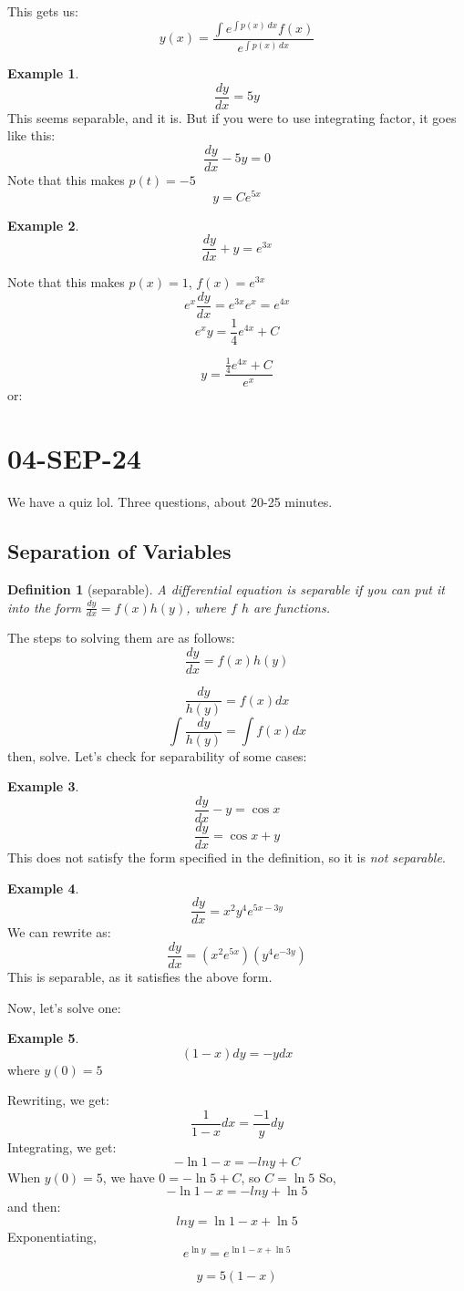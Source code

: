 \documentclass[10pt, oneside]{article}
\newtheorem{defn}{Definition}
\theoremstyle{definition}
\newtheorem{example}{Example}[section]
\begin{document}
This gets us:
\[y(x) = \frac{\int{e^{\int{p(x) \, dx}} f(x)}}{e^{\int{p(x) \, dx}}}\]

\begin{example}
    \[\frac{dy}{dx} = 5y\]
This seems separable, and it is. But if you were to use integrating factor, it goes like this:
\[
    \frac{dy}{dx} - 5y = 0
\]
Note that this makes $p(t) = -5$
\[
y = Ce^{5x}
\]
\end{example}

\begin{example}
    \[\frac{dy}{dx} + y = e^{3x}\]

Note that this makes $p(x) = 1$, $f(x) = e^{3x}$
\[
e^{x}\frac{dy}{dx} = e^{3x}e^x = e^{4x}
\]
\[
e^{x}y = \frac{1}{4}e^{4x} + C
\]

\[
y = \frac{\frac{1}{4}e^{4x} + C}{e^{x}}
\]
or:
\end{example}
\section{04-SEP-24}
We have a quiz lol. Three questions, about 20-25 minutes. 
\subsection{Separation of Variables}
\begin{defn}[separable]
A differential equation is separable if you can put it into the form  $\frac{dy}{dx} = f(x)h(y)$, where $f$ $h$ are functions. 
\end{defn}
The steps to solving them are as follows:
\[ 
    \frac{dy}{dx} = f(x)h(y)
\]

\[ 
    \frac{dy}{h(y)} = f(x)dx
\]
\[ 
    \int{\frac{dy}{h(y)}} = \int{f(x)dx}
\]
then, solve. 
Let's check for separability of some cases:
\begin{example}
   \[\frac{dy}{dx} - y = \cos{x}\]
   \[\frac{dy}{dx} = \cos{x} + y\]
   This does not satisfy the form specified in the definition, so it is \textit{not separable}.
\end{example}
\begin{example}
    \[\frac{dy}{dx} = x^2y^4e^{5x-3y}\]
    We can rewrite as:
    \[\frac{dy}{dx} = (x^2e^{5x})(y^4e^{-3y})\]
    This is separable, as it satisfies the above form. 
 \end{example}
Now, let's solve one: 
\begin{example}
    \[(1-x)dy = -ydx \]
where $y(0) = 5$

Rewriting, we get:
\[\frac{1}{1-x}dx = \frac{-1}{y}dy \]
Integrating, we get:
\[ - \ln{1-x} = - ln{y} + C\]
When $y(0) = 5$, we have $0 = - \ln{5} + C$, so $C = \ln{5}$
So, \[ - \ln{1-x} = - ln{y} + \ln{5}\]
and then:
\[ln{y} = \ln{1-x} + \ln{5}\] 
Exponentiating, 
\[e^{\ln{y}} = e^{\ln{1-x} + \ln{5}} \]

\[y = 5(1-x) \]
\end{example}
\end{document}
